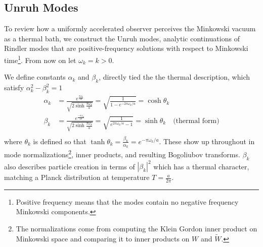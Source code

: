 \documentclass[12pt,a4paper]{article}
\begin{document}
\subsection{Unruh Modes}
To review how a uniformly accelerated observer perceives the Minkowski vacuum as a thermal bath, we construct the Unruh modes\cite{unruh1976notes}, analytic continuations of Rindler modes that are positive-frequency solutions with respect to Minkowski time\footnote{Positive frequency means that the modes contain no negative frequency Minkowski components.}. From now on let $\omega_k = k > 0$.

We define constants $\alpha_k$ and $\beta_k$, directly tied the the thermal description, which satisfy $\alpha_k^2 - \beta_k^2 = 1$
\begin{equation}
  \begin{aligned}
    \alpha_k &= \frac{e^{\frac{\pi\omega_k}{2a}}}{\sqrt{2 \sinh \frac{\pi \omega_k}{a}}} = \sqrt{\frac{1}{1 - e^{-2\pi\omega_k / a}}} = \cosh \theta_k \\
    \beta_k &= \frac{e^{\frac{-\pi\omega_k}{2a}}}{\sqrt{2 \sinh \frac{\pi \omega_k}{a}}} = \sqrt{\frac{1}{e^{2\pi\omega_k / a} - 1}} = \sinh \theta_k \quad \text{(thermal form)} \\
  \end{aligned}
  \label{alpha_beta}
\end{equation}
where $\theta_k$ is defined so that $\tanh{\theta_k} = \frac{\beta_k}{\alpha_k} = e^{-\pi\omega_k / a}$. These show up throughout in mode normalizations\footnote{The normalizations come from computing the Klein Gordon inner product on Minkowski space and comparing it to inner products on $W$ and $\widetilde{W}$.}, inner products, and resulting Bogoliubov transforms. $\beta_k$ also describes particle creation in terms of $|\beta_k|^2$ which has a thermal character, matching a Planck distribution at temperature $T = \frac{a}{2\pi}$.
\end{document}
